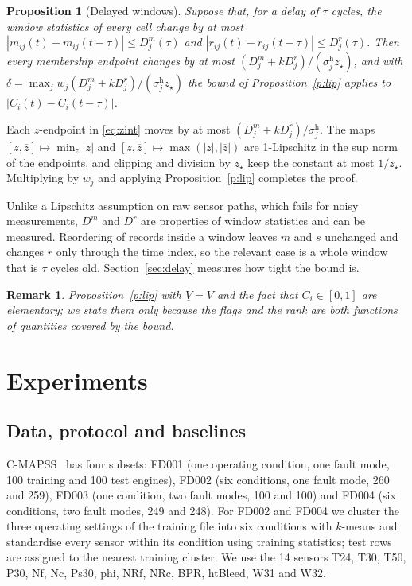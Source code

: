 \documentclass[journal,10pt,twocolumn]{IEEEtran}
\newtheorem{proposition}{Proposition}
\newtheorem{remark}{Remark}
\begin{document}
\begin{proposition}[Delayed windows]
\label{p:delay}
Suppose that, for a delay of $\tau$ cycles, the window statistics of every cell change by at most $|m_{ij}(t)-m_{ij}(t-\tau)|\le D^m_j(\tau)$ and $|r_{ij}(t)-r_{ij}(t-\tau)|\le D^r_j(\tau)$. Then every membership endpoint changes by at most $(D^m_j+kD^r_j)/(\sigma_j^{\mathrm h}z_\star)$, and with $\delta=\max_j w_j(D^m_j+kD^r_j)/(\sigma_j^{\mathrm h}z_\star)$ the bound of Proposition~\ref{p:lip} applies to $|C_i(t)-C_i(t-\tau)|$.
\end{proposition}
\begin{IEEEproof}
Each $z$-endpoint in \eqref{eq:zint} moves by at most $(D^m_j+kD^r_j)/\sigma_j^{\mathrm h}$. The maps $[\underline z,\overline z]\mapsto\min_{z}|z|$ and $[\underline z,\overline z]\mapsto\max(|\underline z|,|\overline z|)$ are 1-Lipschitz in the sup norm of the endpoints, and clipping and division by $z_\star$ keep the constant at most $1/z_\star$. Multiplying by $w_j$ and applying Proposition~\ref{p:lip} completes the proof.
\end{IEEEproof}
Unlike a Lipschitz assumption on raw sensor paths, which fails for noisy measurements, $D^m$ and $D^r$ are properties of window statistics and can be measured. Reordering of records inside a window leaves $m$ and $s$ unchanged and changes $r$ only through the time index, so the relevant case is a whole window that is $\tau$ cycles old. Section~\ref{sec:delay} measures how tight the bound is.

\begin{remark}
Proposition~\ref{p:lip} with $\underline V=\overline V$ and the fact that $C_i\in[0,1]$ are elementary; we state them only because the flags and the rank are both functions of quantities covered by the bound.
\end{remark}

\section{Experiments}
\label{sec:exp}
\subsection{Data, protocol and baselines}
C-MAPSS~\cite{saxena2008} has four subsets: FD001 (one operating condition, one fault mode, 100 training and 100 test engines), FD002 (six conditions, one fault mode, 260 and 259), FD003 (one condition, two fault modes, 100 and 100) and FD004 (six conditions, two fault modes, 249 and 248). For FD002 and FD004 we cluster the three operating settings of the training file into six conditions with $k$-means and standardise every sensor within its condition using training statistics; test rows are assigned to the nearest training cluster. We use the 14 sensors T24, T30, T50, P30, Nf, Nc, Ps30, phi, NRf, NRc, BPR, htBleed, W31 and W32.
\end{document}
